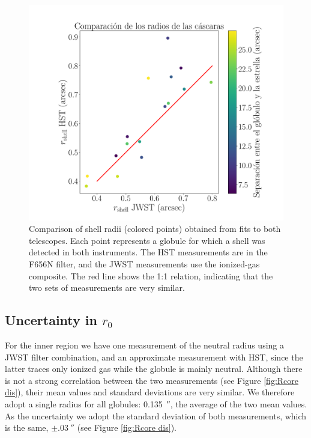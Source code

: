 \documentclass{book}
\begin{document}
\begin{figure}[htb]
    \centering
    \includegraphics[width=\textwidth]{imagenes_corregidas/rshell.pdf}
    \caption{Comparison of shell radii (colored points) obtained from
      fits to both telescopes. Each point represents a globule for
      which a shell was detected in both instruments. The HST
      measurements are in the F656N filter, and the JWST measurements
      use the ionized-gas composite. The red line shows the 1:1
      relation, indicating that the two sets of measurements are very
      similar.}
    \label{fgi: Radios de la cascara}
\end{figure}

\subsection{\boldmath Uncertainty in $r_0$}

For the inner region we have one measurement of the neutral radius
using a JWST filter combination, and an approximate measurement with
HST, since the latter traces only ionized gas while the globule is
mainly neutral. Although there is not a strong correlation between the
two measurements (see Figure \ref{fig:Rcore dis}), their mean values
and standard deviations are very similar. We therefore adopt a single
radius for all globules: \SI{0.135}{\arcsecond}, the average of the
two mean values. As the uncertainty we adopt the standard deviation of
both measurements, which is the same, $\pm\SI{.03}{\arcsecond}$ (see
Figure \ref{fig:Rcore dis}).
\end{document}
